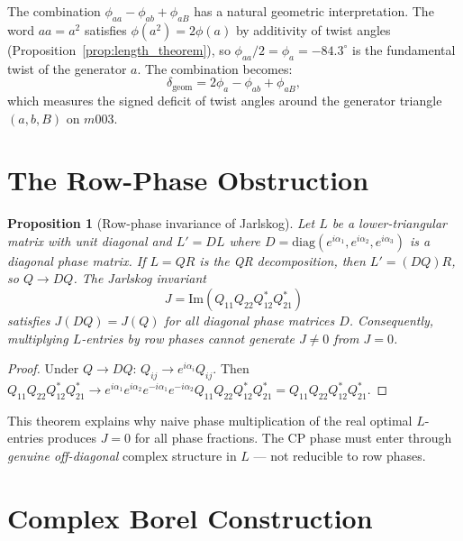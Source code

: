 \documentclass[floatfix,aps,prd,twocolumn,showpacs,superscriptaddress,longbibliography]{revtex4-2}
\newtheorem{proposition}{Proposition}
\begin{document}
The combination $\phi_{aa} - \phi_{ab} + \phi_{aB}$ has a natural
geometric interpretation. The word $aa = a^2$ satisfies
$\phi(a^2) = 2\phi(a)$ by additivity of twist angles
(Proposition~\ref{prop:length_theorem}), so
$\phi_{aa}/2 = \phi_a = -84.3^\circ$ is the fundamental twist of
the generator $a$. The combination becomes:
\begin{equation}
\delta_{\mathrm{geom}} = 2\phi_a - \phi_{ab} + \phi_{aB},
\end{equation}
which measures the signed deficit of twist angles around the
generator triangle $(a, b, B)$ on $m003$.

\section{The Row-Phase Obstruction}
\label{sec:obstruction}

\begin{proposition}[Row-phase invariance of Jarlskog]
\label{prop:rowphase}
Let $L$ be a lower-triangular matrix with unit diagonal and
$L' = DL$ where $D = \mathrm{diag}(e^{i\alpha_1}, e^{i\alpha_2},
e^{i\alpha_3})$ is a diagonal phase matrix.
If $L = QR$ is the QR decomposition, then $L' = (DQ)R$,
so $Q \to DQ$. The Jarlskog invariant
\begin{equation}
J = \mathrm{Im}(Q_{11}Q_{22}Q_{12}^* Q_{21}^*)
\end{equation}
satisfies $J(DQ) = J(Q)$ for all diagonal phase matrices $D$.
Consequently, multiplying $L$-entries by row phases cannot
generate $J \neq 0$ from $J = 0$.
\end{proposition}

\begin{proof}
Under $Q \to DQ$: $Q_{ij} \to e^{i\alpha_i}Q_{ij}$.
Then $Q_{11}Q_{22}Q_{12}^*Q_{21}^* \to
e^{i\alpha_1}e^{i\alpha_2}e^{-i\alpha_1}e^{-i\alpha_2}
Q_{11}Q_{22}Q_{12}^*Q_{21}^* = Q_{11}Q_{22}Q_{12}^*Q_{21}^*$.
\end{proof}

This theorem explains why naive phase multiplication of the real
optimal $L$-entries produces $J = 0$ for all phase fractions.
The CP phase must enter through \emph{genuine off-diagonal} complex
structure in $L$ — not reducible to row phases.

\section{Complex Borel Construction}
\label{sec:complex}
\end{document}

